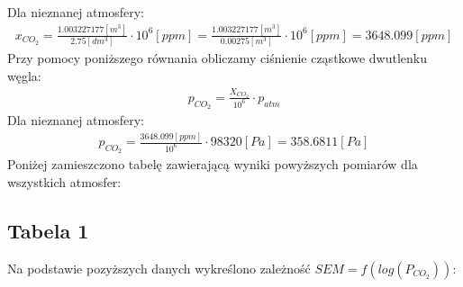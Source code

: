 \documentclass[11pt]{article}
\begin{document}
    \noindent Dla nieznanej atmosfery:
    \begin{gather}
        x_{CO_2}=\frac{1.003227177[m^3]}{2.75[dm^3]}\cdot 10^6[ppm]=\frac{1.003227177[m^3]}{0.00275[m^3]}\cdot 10^6[ppm]=3648.099[ppm]
    \end{gather}
    \noindent Przy pomocy poniższego równania obliczamy ciśnienie cząstkowe dwutlenku węgla:
    \begin{gather}
        p_{CO_2}=\frac{X_{CO_2}}{10^6}\cdot p_{atm}
    \end{gather}
    \noindent Dla nieznanej atmosfery:
    \begin{gather}
        p_{CO_2}=\frac{3648.099[ppm]}{10^6}\cdot 98320[Pa]=358.6811[Pa]
    \end{gather}
    \noindent Poniżej zamieszczono tabelę zawierającą wyniki powyższych pomiarów dla wszystkich atmosfer:
    \subsection{Tabela 1}
    \begin{center}
        \Large{}
    \end{center}
    \indent Na podstawie pozyższych danych wykreślono zależność $SEM=f(log(P_{CO_2}))$:\\


    \noindent{}
\end{document}
